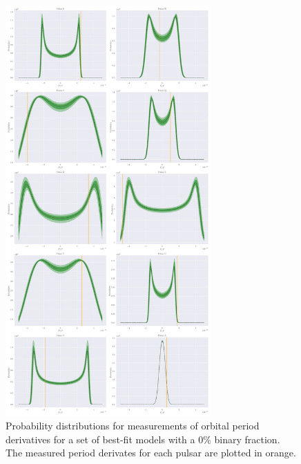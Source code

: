 \begin{figure}
	\centering
	\includegraphics[width=0.7\textwidth]{figures/pulsar_posteriors/Paz.png}
	\caption{Probability distributions for measurements of orbital period derivatives for a set
		of best-fit models with a $0\%$ binary fraction. The measured period derivates for
		each pulsar are plotted in orange. }
	\label{fig:pulsar_Paz_orbital}
\end{figure}

